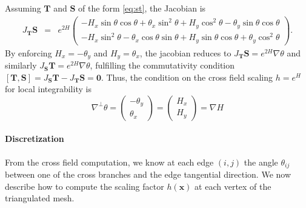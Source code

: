 \documentclass[AMA,STIX1COL]{WileyNJD-v2}
\newcommand{\vz}{\ensuremath{\mathbf{0}}}
\newcommand{\vx}{\ensuremath{\mathbf{x}}}
\newcommand{\vX}{{\ensuremath{\mathbf{T}}}}
\newcommand{\vY}{{\ensuremath{\mathbf{S}}}}
\begin{document}
{\begin{equation}
\label{eq:st}
\end{equation}
Assuming $\vX$ and $\vY$ of the form \eqref{eq:st}, the Jacobian is
\begin{eqnarray}
J_\vX \vY &=& 
 e^{2H}
\begin{pmatrix}
-H_x \sin{\theta} \cos{\theta} + \theta_x \sin^2 \theta + H_y
\cos^2{\theta} - \theta_y \sin{\theta} \cos{\theta} \nonumber \\ 
-H_x \sin^2{\theta} - \theta_x \cos{\theta} \sin{\theta} + H_y \sin{\theta}\cos{\theta} + \theta_y \cos^2{\theta}  
\end{pmatrix} \nonumber.
\end{eqnarray}
By enforcing $H_x = - \theta_y$ and $H_y = \theta_x$, the jacobian reduces to 
$J_\vX \vY  = e^{2H}\nabla \theta$ and similarly $J_\vY \vX  = e^{2H}\nabla \theta$,
fulfilling the commutativity condition $[\vX,\vY] = J_\vY \vX -  J_\vX \vY = \vz$.
Thus, the condition on the cross field scaling $h = e^H$ for local integrability is
\begin{equation}
\nabla^\perp \theta = \begin{pmatrix}-\theta_y \\ \theta_x \end{pmatrix}= \begin{pmatrix}H_x \\ H_y\end{pmatrix}= \nabla H
\end{equation}

\paragraph{Discretization}

From the cross field computation, we know at each edge $(i,j)$ the angle
$\theta_{ij}$ between one of the cross branches and the edge tangential
direction. We now describe how to compute the scaling factor $h(\vx)$ at each
vertex of the triangulated mesh.

}
\end{document}
